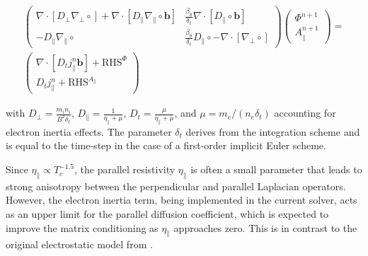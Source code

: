 \begin{align}
		\label{eq:impl_implicitVorticitySystem}
	\begin{pmatrix}
		\nabla \cdot \left[ D_\perp \nabla_\perp \circ \right] + \nabla \cdot \left[ D_\parallel \nabla_\parallel \circ \mathbf{b} \right]  
		& \frac{\beta_0}{\delta_t} \nabla \cdot \left[ D_\parallel \circ \mathbf{b} \right] \\
		-D_\parallel \nabla_\parallel \circ &
		\frac{\beta_0}{\delta_t} D_\parallel \circ - \nabla \cdot \left[ \nabla_\perp \circ \right]
	\end{pmatrix}
	\begin{pmatrix}
		\Phi^{n+1} \\ A_\parallel^{n+1}
	\end{pmatrix} 
	= \nonumber \\
	\begin{pmatrix}
		\nabla \cdot \left[ D_t j^{n}_\parallel \mathbf{b} \right] + \text{RHS}^\Phi \\
		D_t j^{n}_\parallel + \text{RHS}^{A_\parallel}
	\end{pmatrix}
\end{align}

with $D_\perp = \frac{m_i n_i}{B^2 \delta_t}$, $D_\parallel = \frac{1}{\eta_\parallel + \mu}$, $D_t = \frac{\mu}{\eta_\parallel + \mu}$, and $\mu = m_e / (n_e \delta_t)$ accounting for electron inertia effects. The parameter $\delta_t$ derives from the integration scheme and is equal to the time-step in the case of a first-order implicit Euler scheme. \newline

Since $\eta_\parallel \propto T_e^{-1.5}$, the parallel resistivity $\eta_\parallel$ is often a small parameter that leads to strong anisotropy between the perpendicular and parallel Laplacian operators. However, the electron inertia term, being implemented in the current solver, acts as an upper limit for the parallel diffusion coefficient, which is expected to improve the matrix conditioning as $\eta_\parallel$ approaches zero. This is in contrast to the original electrostatic model from \cite{Bufferand2021}. \newline


